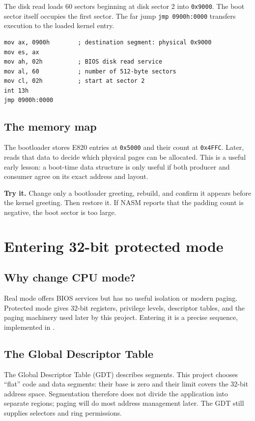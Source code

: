\documentclass[11pt,oneside]{book}
\newcommand{\pathname}[1]{\texttt{\detokenize{#1}}}
\newcommand{\exercise}[1]{\medskip\noindent\textbf{Try it.} #1\medskip}
\begin{document}
The disk read loads 60 sectors beginning at disk sector 2 into \texttt{0x9000}. The boot sector itself occupies the first sector. The far jump \texttt{jmp 0900h:0000} transfers execution to the loaded kernel entry.

\begin{verbatim}
mov ax, 0900h        ; destination segment: physical 0x9000
mov es, ax
mov ah, 02h          ; BIOS disk read service
mov al, 60           ; number of 512-byte sectors
mov cl, 02h          ; start at sector 2
int 13h
jmp 0900h:0000
\end{verbatim}

\section{The memory map}
The bootloader stores E820 entries at \texttt{0x5000} and their count at \texttt{0x4FFC}. Later, \pathname{memory/pmm.c} reads that data to decide which physical pages can be allocated. This is a useful early lesson: a boot-time data structure is only useful if both producer and consumer agree on its exact address and layout.

\exercise{Change only a bootloader greeting, rebuild, and confirm it appears before the kernel greeting. Then restore it. If NASM reports that the padding count is negative, the boot sector is too large.}

\chapter{Entering 32-bit protected mode}
\section{Why change CPU mode?}
Real mode offers BIOS services but has no useful isolation or modern paging. Protected mode gives 32-bit registers, privilege levels, descriptor tables, and the paging machinery used later by this project. Entering it is a precise sequence, implemented in \pathname{kernel/kernel_intro.asm}.

\section{The Global Descriptor Table}
The Global Descriptor Table (GDT) describes segments. This project chooses ``flat'' code and data segments: their base is zero and their limit covers the 32-bit address space. Segmentation therefore does not divide the application into separate regions; paging will do most address management later. The GDT still supplies selectors and ring permissions.
\end{document}
